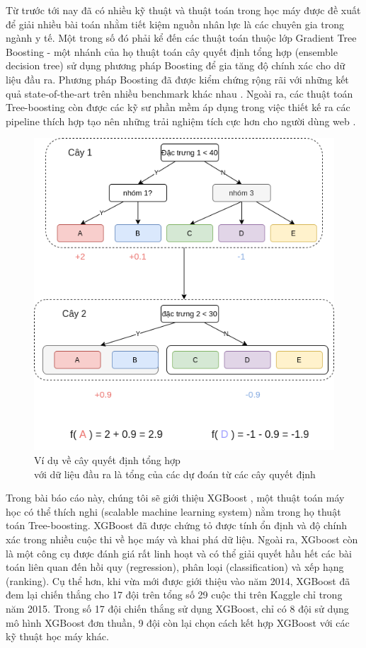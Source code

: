 \documentclass{article}
\begin{document}
Từ trước tới nay đã có nhiều kỹ thuật và thuật toán trong học máy được đề xuất để giải nhiều bài toán nhằm tiết kiệm nguồn nhân lực là các chuyên gia trong ngành y tế. Một trong số đó phải kể đến các thuật toán thuộc lớp Gradient Tree Boosting \cite{gradient-boosting} - một nhánh của họ thuật toán cây quyết định tổng hợp (ensemble decision tree) sử dụng phương pháp Boosting để gia tăng độ chính xác cho dữ liệu đầu ra. Phương pháp Boosting đã được kiểm chứng rộng rãi với những kết quả state-of-the-art trên nhiều benchmark khác nhau \cite{sota-xgboost}. Ngoài ra, các thuật toán Tree-boosting còn được các kỹ sư phần mềm áp dụng trong việc thiết kế ra các pipeline thích hợp tạo nên những trải nghiệm tích cực hơn cho người dùng web \cite{example1}.
\begin{center} 
\begin{figure}[!h]
    \centering
    \includegraphics[scale=0.4]{graph-Page-1.drawio.png}
    \caption{Ví dụ về cây quyết định tổng hợp\\với dữ liệu đầu ra là tổng của các dự đoán từ các cây quyết định}
    \label{fig:Viducayquyetdinh}
\end{figure}
\end{center}
Trong bài báo cáo này, chúng tôi sẽ giới thiệu XGBoost \cite{xgboost}, một thuật toán máy học có thể thích nghi (scalable machine learning system) nằm trong họ thuật toán Tree-boosting. XGBoost đã được chứng tỏ được tính ổn định và độ chính xác trong nhiều cuộc thi về học máy và khai phá dữ liệu. Ngoài ra, XGboost còn là một công cụ được đánh giá rất linh hoạt và có thể giải quyết hầu hết các bài toán liên quan đến hồi quy (regression), phân loại (classification) và xếp hạng (ranking). Cụ thể hơn, khi vừa mới được giới thiệu vào năm 2014, XGBoost đã đem lại chiến thắng cho 17 đội trên tổng số 29 cuộc thi trên Kaggle chỉ trong năm 2015. Trong số 17 đội chiến thắng sử dụng XGBoost, chỉ có 8 đội sử dụng mô hình XGBoost đơn thuần, 9 đội còn lại chọn cách kết hợp XGBoost với các kỹ thuật học máy khác.
\end{document}
